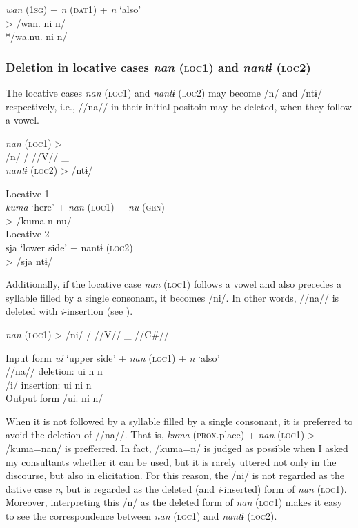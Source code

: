 \ea\label{ex:6-37}
    \textit{wan}  (1\textsc{sg})  +  \textit{n}  (\textsc{dat}1)  +  \textit{n}  ‘also’\\
  >  /wan.      ni      n/  \\
    */wa.nu.      ni      n/  
\z

\subsubsection{Deletion in locative cases \textit{nan} (\textsc{loc1}) and \textit{nantɨ} (\textsc{loc2})}

The locative cases \textit{nan} (\textsc{loc1}) and \textit{nantɨ} (\textsc{loc2}) may become /n/ and /ntɨ/ respectively, i.e., //na// in their initial positoin may be deleted, when they follow a vowel.

\ea\label{ex:6-38}
  \textit{nan}  (\textsc{loc1})  > \\ %
/n/    /  //V//  \_\\
  \textit{nantɨ}  (\textsc{loc2})  >  /ntɨ/
  \z

\ea\label{ex:6-39}
 \ea Locative 1      \\
    \textit{kuma}  ‘here’  +  \textit{nan}  (\textsc{loc1})  +  \textit{nu}  (\textsc{gen})\\
  >  /kuma      n      nu/  \\

\ex Locative 2      \\
    sja  ‘lower side’  +  nantɨ  (\textsc{loc2})\\
  >  /sja      ntɨ/        
  \z
  \z

Additionally, if the locative case \textit{nan} (\textsc{loc1}) follows a vowel and also precedes a syllable filled by a single consonant, it becomes /ni/. In other words, //na// is deleted with \textit{i}-insertion (see ).

\ea\label{ex:6-40}
  \textit{nan}  (\textsc{loc1})  >  /ni/  /  //V//  \_  //C\#//

\ea\label{ex:6-41}
  Input form  \textit{ui}  ‘upper side’  +  \textit{nan}  (\textsc{loc1})  +  \textit{n}  ‘also’\\
  //na// deletion:  ui      n      n  \\
  /i/ insertion:  ui      ni      n  \\
  Output form  /ui.      ni      n/  
\z

When it is not followed by a syllable filled by a single consonant, it is preferred to avoid the deletion of //na//. That is, \textit{kuma} (\textsc{prox}.place) + \textit{nan} (\textsc{loc1}) > /kuma=nan/ is prefferred. In fact, /kuma=n/ is judged as possible when I asked my consultants whether it can be used, but it is rarely uttered not only in the discourse, but also in elicitation. For this reason, the /ni/ is not regarded as the dative case \textit{n}, but is regarded as the deleted (and \textit{i}-inserted) form of \textit{nan} (\textsc{loc1}). Moreover, interpreting this /n/ as the deleted form of \textit{nan} (\textsc{loc1}) makes it easy to see the correspondence between \textit{nan} (\textsc{loc1}) and \textit{nantɨ} (\textsc{loc2}).

